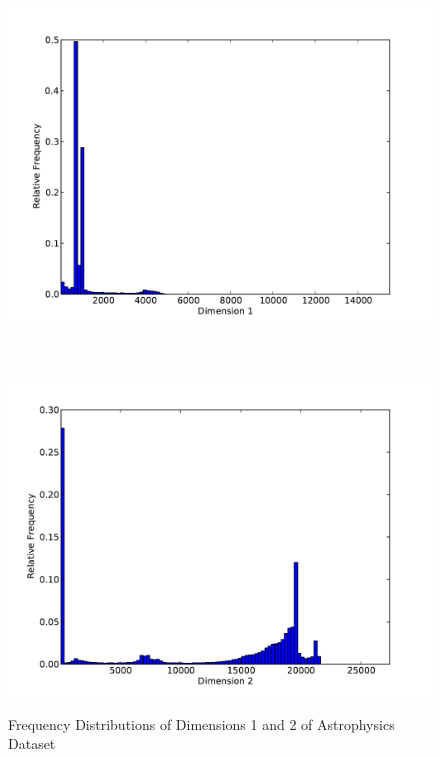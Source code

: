 \begin{figure}
	\begin{center}
		\begin{subfloat}{%
			\includegraphics[scale=0.36]{figures/histograms/astrophysics_500000_0.pdf}
		}
		\end{subfloat}~
		\begin{subfloat}{%
			\includegraphics[scale=0.36]{figures/histograms/astrophysics_500000_1.pdf}
		}
		\end{subfloat}
	\end{center}

	\caption{Frequency Distributions of Dimensions 1 and 2 of Astrophysics Dataset}
	\label{fig:astrophysics-histograms1}
\end{figure}

